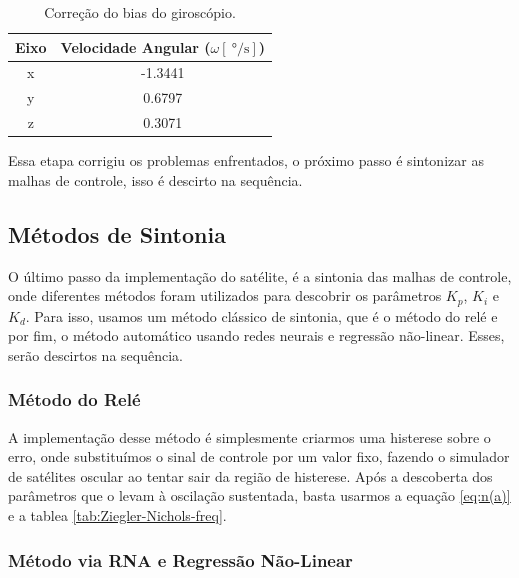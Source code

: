 \begin{table}[H]
  \caption{Correção do bias do giroscópio.}
  \label{tab:bias_correction}
  \centering%
  \begin{minipage}{.42\textwidth}
    \begin{tabular*}{\textwidth}{cc}
      \hline
      {Eixo} & Velocidade Angular ($\omega [\SI{}{\degree\per\second}]$)\\ \hline
      \hline
      x  &  -1.3441 \\ 
      y  &  0.6797 \\
      z  &  0.3071 \\ \hline
    \end{tabular*}
  \end{minipage}
\end{table}

Essa etapa corrigiu os problemas enfrentados, o próximo passo é sintonizar as malhas de controle, isso é descirto na sequência.



\subsection{Métodos de Sintonia}

O último passo da implementação do satélite, é a sintonia das malhas de controle, onde diferentes métodos foram utilizados para descobrir os parâmetros \textit{$K_p$}, \textit{$K_i$} e \textit{$K_d$}. Para isso, usamos um método clássico de sintonia, que é o método do relé e por fim, o método automático usando redes neurais e regressão não-linear. Esses, serão descirtos na sequência. 



\subsubsection{Método do Relé}

A implementação desse método é simplesmente criarmos uma histerese sobre o erro, onde substituímos o sinal de controle por um valor fixo, fazendo o simulador de satélites oscular ao tentar sair da região de histerese. Após a descoberta dos parâmetros que o levam  à oscilação sustentada, basta usarmos a equação \ref{eq:n(a)} e a tablea \ref{tab:Ziegler-Nichols-freq}.



\subsubsection{Método via RNA e Regressão Não-Linear}

